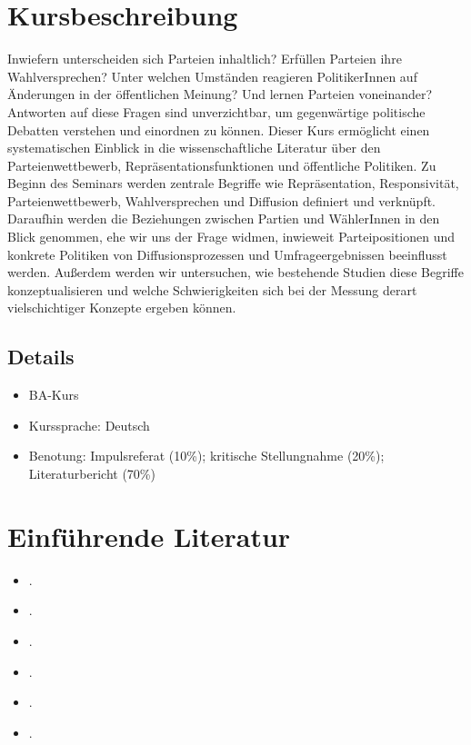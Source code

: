 \documentclass[abstract=on,parskip=full,headings=standardclasses,fontsize=11pt,paper=a4]{scrartcl}
\begin{document}
\section*{Kursbeschreibung}

Inwiefern unterscheiden sich Parteien inhaltlich? Erfüllen Parteien ihre Wahlversprechen? Unter welchen Umständen reagieren PolitikerInnen auf Änderungen in der öffentlichen Meinung? Und lernen Parteien voneinander? Antworten auf diese Fragen sind unverzichtbar, um gegenwärtige politische Debatten verstehen und einordnen zu können. Dieser Kurs ermöglicht einen systematischen Einblick in die wissenschaftliche Literatur über den Parteienwettbewerb, Repräsentationsfunktionen und öffentliche Politiken. Zu Beginn des Seminars werden zentrale Begriffe wie Repräsentation, Responsivität, Parteienwettbewerb, Wahlversprechen und Diffusion definiert und verknüpft. Daraufhin werden die Beziehungen zwischen Partien und WählerInnen in den Blick genommen, ehe wir uns der Frage widmen, inwieweit Parteipositionen und konkrete Politiken von Diffusionsprozessen und Umfrageergebnissen beeinflusst werden. Außerdem werden wir untersuchen, wie bestehende Studien diese Begriffe konzeptualisieren und welche Schwierigkeiten sich bei der Messung derart vielschichtiger Konzepte ergeben können.

\subsection*{Details}

\begin{itemize}
\item BA-Kurs
\item  Kurssprache: Deutsch
\item Benotung: Impulsreferat (10\%); kritische Stellungnahme (20\%); Literaturbericht (70\%)
\end{itemize}



\section*{Einführende Literatur}

\begin{itemize}
\item {}.
\item {}.
\item {}.
\item {}.
\item {}.
\item {}.
\end{itemize}
\end{document}
